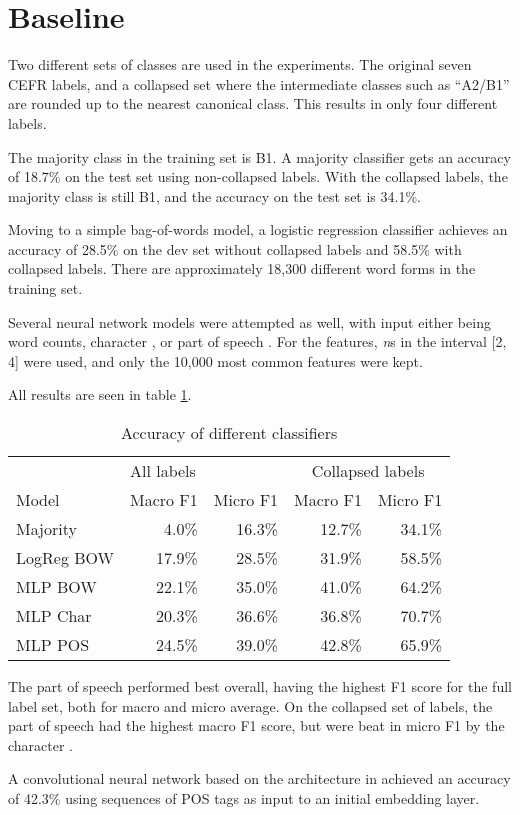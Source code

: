 \section{Baseline}

Two different sets of classes are used in the experiments. The original seven
CEFR labels, and a collapsed set where the intermediate classes such as
``A2/B1'' are rounded up to the nearest canonical class. This results in only
four different labels.

The majority class in the training set is B1. A majority classifier gets an
accuracy of 18.7\% on the test set using non-collapsed labels. With the
collapsed labels, the majority class is still B1, and the accuracy on the
test set is 34.1\%.

Moving to a simple bag-of-words model, a logistic regression classifier
achieves an accuracy of 28.5\% on the dev set without collapsed labels and
58.5\% with collapsed labels. There are approximately 18,300 different word
forms in the training set.

Several neural network models were attempted as well, with input either being
word counts, character \ngrams, or part of speech \ngrams. For the \ngram
features, \textit{n}s in the interval [2, 4] were used, and only the 10,000
most common features were kept.

All results are seen in table \ref{baseline-accuracies}.

\begin{table}
  \centering
  \begin{tabular}{|l|rr|rr|}
    \toprule
      & \multicolumn{2}{|l|}{All labels} & \multicolumn{2}{|c|}{Collapsed labels} \\
    Model      & Macro F1 & Micro F1 & Macro F1 & Micro F1 \\
    \midrule
    Majority   &    4.0\% &   16.3\% &   12.7\% &   34.1\% \\
    LogReg BOW &   17.9\% &   28.5\% &   31.9\% &   58.5\% \\
    MLP BOW    &   22.1\% &   35.0\% &   41.0\% &   64.2\% \\
    MLP Char   &   20.3\% &   36.6\% &   36.8\% &   70.7\% \\
    MLP POS    &   24.5\% &   39.0\% &   42.8\% &   65.9\% \\
    \bottomrule
  \end{tabular}
  \caption{Accuracy of different classifiers}
  \label{baseline-accuracies}
\end{table}

The part of speech \ngrams performed best overall, having the highest F1 score
for the full label set, both for macro and micro average. On the collapsed set
of labels, the part of speech \ngrams had the highest macro F1 score, but were
beat in micro F1 by the character \ngrams.

A convolutional neural network based on the architecture in
\textcite{zhang2017sensitivity} achieved an accuracy of 42.3\% using
sequences of POS tags as input to an initial embedding layer.
